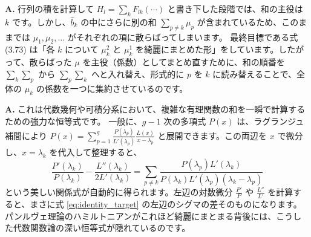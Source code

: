 \begin{Q}
\textbf{A.} 行列の積を計算して $H_l = \sum_k F_{lk} (\cdots)$ と書き下した段階では、和の主役は $k$ です。しかし、$\hat{b}_k$ の中にさらに別の和 $\sum_{p \neq k} \mu_p$ が含まれているため、このままでは $\mu_1, \mu_2, \dots$ がそれぞれの項に散らばってしまいます。
最終目標である式 (3.73) は「各 $k$ について $\mu_k^2$ と $\mu_k^1$ を綺麗にまとめた形」をしています。したがって、散らばった $\mu$ を主役（係数）としてまとめ直すために、和の順番を $\sum_k \sum_p$ から $\sum_p \sum_k$ へと入れ替え、形式的に $p$ を $k$ に読み替えることで、全体の $\mu_k$ の係数を一つに集約させているのです。
\end{Q}

\begin{Q}
\textbf{A.} これは代数幾何や可積分系において、複雑な有理関数の和を一瞬で計算するための強力な恒等式です。
一般に、$g-1$ 次の多項式 $P(x)$ は、ラグランジュ補間により $P(x) = \sum_{p=1}^g \frac{P(\lambda_p)}{L'(\lambda_p)} \frac{L(x)}{x-\lambda_p}$ と展開できます。この両辺を $x$ で微分し、$x = \lambda_k$ を代入して整理すると、
\begin{equation*}
    \frac{P'(\lambda_k)}{P(\lambda_k)} - \frac{L''(\lambda_k)}{2L'(\lambda_k)} = \sum_{p \neq k} \frac{P(\lambda_p)L'(\lambda_k)}{P(\lambda_k)L'(\lambda_p)(\lambda_k-\lambda_p)}
\end{equation*}
という美しい関係式が自動的に得られます。左辺の対数微分 $\frac{P'}{P}$ や $\frac{L''}{L'}$ を計算すると、まさに式 \eqref{eq:identity_target} の左辺のシグマの差そのものになります。パンルヴェ理論のハミルトニアンがこれほど綺麗にまとまる背後には、こうした代数関数論の深い恒等式が隠れているのです。
\end{Q}

